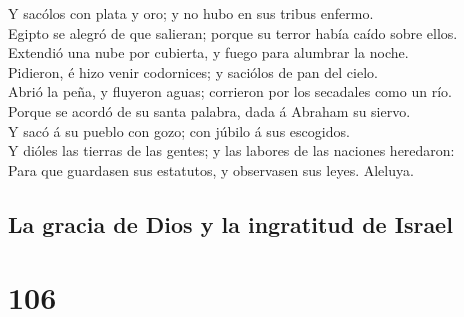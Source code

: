  Y sacólos con plata y oro; y no hubo en sus tribus
enfermo.\\
 Egipto se alegró de que salieran; porque su terror había
caído sobre ellos.\\
 Extendió una nube por cubierta, y fuego para alumbrar la
noche.\\
 Pidieron, é hizo venir codornices; y saciólos de pan del
cielo.\\
 Abrió la peña, y fluyeron aguas; corrieron por los
secadales como un río.\\
 Porque se acordó de su santa palabra, dada á Abraham su
siervo.\\
 Y sacó á su pueblo con gozo; con júbilo á sus
escogidos.\\
 Y dióles las tierras de las gentes; y las labores de las
naciones heredaron:\\
 Para que guardasen sus estatutos, y observasen sus
leyes. Aleluya.

\hypertarget{la-gracia-de-dios-y-la-ingratitud-de-israel}{%
\subsection{La gracia de Dios y la ingratitud de
Israel}\label{la-gracia-de-dios-y-la-ingratitud-de-israel}}

\hypertarget{section-19-106}{%
\section{106}\label{section-19-106}}

